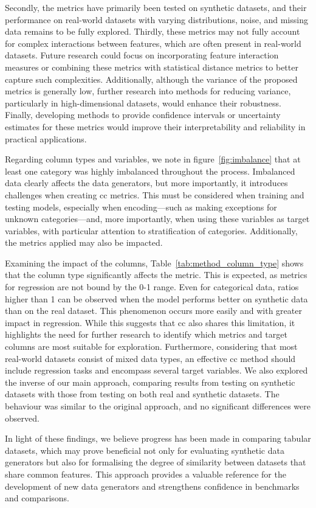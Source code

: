 Secondly, the metrics have primarily been tested on synthetic datasets, and their performance on real-world datasets with varying distributions, noise, and missing data remains to be fully explored. Thirdly, these metrics may not fully account for complex interactions between features, which are often present in real-world datasets. Future research could focus on incorporating feature interaction measures or combining these metrics with statistical distance metrics to better capture such complexities. Additionally, although the variance of the proposed metrics is generally low, further research into methods for reducing variance, particularly in high-dimensional datasets, would enhance their robustness. Finally, developing methods to provide confidence intervals or uncertainty estimates for these metrics would improve their interpretability and reliability in practical applications.

Regarding column types and variables, we note in figure~\ref{fig:imbalance} that at least one category was highly imbalanced throughout the process. Imbalanced data clearly affects the data generators, but more importantly, it introduces challenges when creating \ac{cc} metrics. This must be considered when training and testing models, especially when encoding—such as making exceptions for unknown categories—and, more importantly, when using these variables as target variables, with particular attention to stratification of categories. Additionally, the metrics applied may also be impacted.

Examining the impact of the columns, Table~\ref{tab:method_column_type} shows that the column type significantly affects the metric. This is expected, as metrics for regression are not bound by the 0-1 range. Even for categorical data, ratios higher than 1 can be observed when the model performs better on synthetic data than on the real dataset. This phenomenon occurs more easily and with greater impact in regression. While this suggests that \ac{cc} also shares this limitation, it highlights the need for further research to identify which metrics and target columns are most suitable for exploration. Furthermore, considering that most real-world datasets consist of mixed data types, an effective \ac{cc} method should include regression tasks and encompass several target variables. We also explored the inverse of our main approach, comparing results from testing on synthetic datasets with those from testing on both real and synthetic datasets. The behaviour was similar to the original approach, and no significant differences were observed.

In light of these findings, we believe progress has been made in comparing tabular datasets, which may prove beneficial not only for evaluating synthetic data generators but also for formalising the degree of similarity between datasets that share common features. This approach provides a valuable reference for the development of new data generators and strengthens confidence in benchmarks and comparisons.